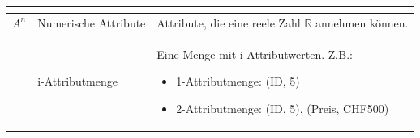 \begin{table}[H]
\begin{tabular}{ | c | C{2.5cm} | p{10cm} |}
\begin{itemize}
			\end{itemize} \\ \hline
		$A^n$ & Numerische Attribute & Attribute, die eine reele Zahl $\mathbb{R}$ annehmen können.\\ \hline
		& i-Attributmenge & Eine Menge mit i Attributwerten. Z.B.:
			\begin{itemize}
			\item 1-Attributmenge: { (ID, 5) }
			\item 2-Attributmenge: { (ID, 5), (Preis, CHF500)}
			\end{itemize}\\ \hline 
	\end{tabular} 
\end{table}